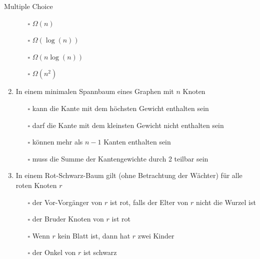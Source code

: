 \documentclass{article}
\begin{document}
\begin{exercise}{Multiple Choice}
\begin{enumerate}
          \begin{itemize}
            \item[$\square$] $\Omega(n)$
            \item[$\square$] $\Omega(\log(n))$
            \item[$\square$] $\Omega(n \log(n))$
            \item[$\square$] $\Omega(n^2)$
          \end{itemize}
    \item In einem minimalen Spannbaum eines Graphen mit $n$ Knoten
          \begin{itemize}
            \item[$\square$] kann die Kante mit dem höchsten Gewicht enthalten sein
            \item[$\square$] darf die Kante mit dem kleinsten Gewicht nicht enthalten sein
            \item[$\square$] können mehr als $n - 1$ Kanten enthalten sein
            \item[$\square$] muss die Summe der Kantengewichte durch 2 teilbar sein
          \end{itemize}
    \item In einem Rot-Schwarz-Baum gilt (ohne Betrachtung der Wächter) für alle roten Knoten $r$
          \begin{itemize}
            \item[$\square$] der Vor-Vorgänger von $r$ ist rot, falls der Elter von $r$ nicht die Wurzel ist
            \item[$\square$] der Bruder Knoten von $r$ ist rot
            \item[$\square$] Wenn $r$ kein Blatt ist, dann hat $r$ zwei Kinder
            \item[$\square$] der Onkel von $r$ ist schwarz
          \end{itemize}
  \end{enumerate}
  \begin{solution}

  \end{solution}
\end{exercise}
\end{document}
